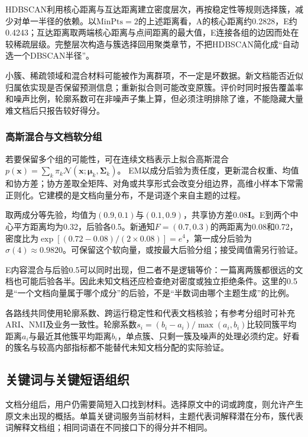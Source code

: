 HDBSCAN利用核心距离与互达距离建立密度层次，再按稳定性等规则选择簇，减少对单一半径的依赖。以$\mathrm{MinPts}=2$的上述距离看，A的核心距离约0.2828，E约0.4243；互达距离取两端核心距离与点间距离的最大值，E连接各组的边因而处在较稀疏层级。完整层次构造与簇选择回用聚类章节，不把HDBSCAN简化成“自动选一个DBSCAN半径”。

小簇、稀疏领域和混合材料可能被作为离群项，不一定是坏数据。新文档能否近似归属依实现是否保留预测信息；重新拟合则可能改变原簇。评价时同时报告覆盖率和噪声比例，轮廓系数可在非噪声子集上算，但必须注明排除了谁，不能隐藏大量难文档后只报告较好得分。

\subsubsection{高斯混合与文档软分组}
\label{sec:nlp-classification-gmm}

若要保留多个组的可能性，可在连续文档表示上拟合高斯混合
$p(\bm x)=\sum_k\pi_k\mathcal N(\bm x;\bm\mu_k,\bm\Sigma_k)$。
EM以成分后验为责任度，更新混合权重、均值和协方差；协方差取全矩阵、对角或共享形式会改变分组边界，高维小样本下常需正则化。它建模的是文档向量分布，不是词逐个来自主题的过程。

取两成分等先验，均值为$(0.9,0.1)$与$(0.1,0.9)$，共享协方差$0.08\bm I$。E到两个中心平方距离均为0.32，后验各0.5。新通知$F=(0.7,0.3)$的两距离为0.08和0.72，密度比为$\exp[(0.72-0.08)/(2\times0.08)]=e^4$，第一成分后验为$\sigma(4)\approx0.9820$。可保留这个软向量，或按最大后验分组；接受阈值需另行验证。

E内容混合与后验0.5可以同时出现，但二者不是逻辑等价：一篇离两簇都很远的文档也可能后验各半。因此未知文档还应检查绝对密度或独立拒绝条件。这里的0.5是“一个文档向量属于哪个成分”的后验，不是“半数词由哪个主题生成”的比例。

各路线共同使用轮廓系数、跨运行稳定性和代表文档核验；有参考分组时可补充ARI、NMI及业务一致性。轮廓系数$s_i=(b_i-a_i)/\max(a_i,b_i)$比较同簇平均距离$a_i$与最近其他簇平均距离$b_i$，单点簇、只剩一簇及噪声的处理必须约定。好看的簇名与较高内部指标都不能替代未知文档分配的实际验证。

\subsection{关键词与关键短语组织}
\label{sec:nlp-classification-keyphrases}

文档分组后，用户仍需要简短入口找到材料。选择原文中的词或跨度，则允许产生原文未出现的概括。单篇关键词服务当前材料，主题代表词解释潜在分布，簇代表词解释文档组；相同词语在不同接口下的得分并不相同。

